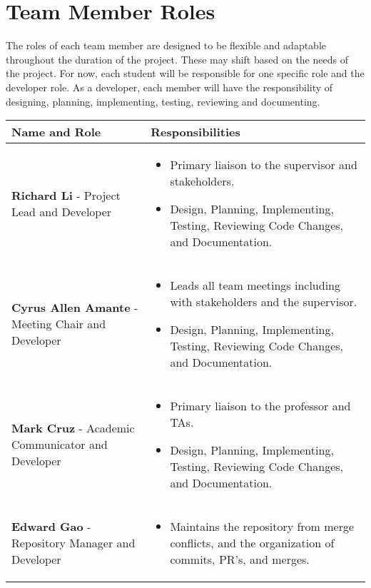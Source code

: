 \documentclass{article}
\begin{document}
\section{Team Member Roles}
The roles of each team member are designed to be flexible and adaptable throughout the duration of the project. These may shift based on the needs of the project. For now, each student will be responsible for one specific role and the developer role. As a developer, each member will have the responsibility of designing, planning, implementing, testing, reviewing and documenting.
\begin{center}
  \setlength{\arrayrulewidth}{0.5mm}
  \setlength{\tabcolsep}{10pt}
  \renewcommand{\arraystretch}{1.5}
  \begin{tabular}{ | m{4cm} | m{9cm} | } 
    \hline
      \textbf{Name and Role} & \textbf{Responsibilities} \\ 
      \hline
        \textbf{Richard Li} - Project Lead and Developer & \begin{itemize}
      \item Primary liaison to the supervisor and stakeholders.
      \item Design, Planning, Implementing, Testing, Reviewing Code Changes, and Documentation.
    \end{itemize}\\ 
      \hline
        \textbf{Cyrus Allen Amante} - Meeting Chair and Developer & \begin{itemize}
      \item Leads all team meetings including with stakeholders and the supervisor.
      \item Design, Planning, Implementing, Testing, Reviewing Code Changes, and Documentation.
    \end{itemize}\\ 
      \hline
        \textbf{Mark Cruz} - Academic Communicator and Developer & \begin{itemize}
      \item Primary liaison to the professor and TAs.
      \item Design, Planning, Implementing, Testing, Reviewing Code Changes, and Documentation.
    \end{itemize}\\ 
      \hline
        \textbf{Edward Gao} - Repository Manager and Developer & \begin{itemize}
      \item Maintains the repository from merge conflicts, and the organization of commits, PR's, and merges.

\end{itemize}
\end{tabular}
\end{center}
\end{document}
